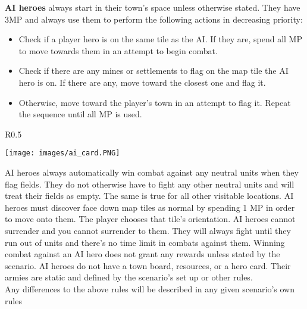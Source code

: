 \documentclass[12pt]{article}
\begin{document}
\clearpage
\textbf{AI heroes} always start in their town's space unless otherwise stated. They have 3MP and always use them to perform the following actions in decreasing priority:
\begin{itemize}
    \item Check if a player hero is on the same tile as the AI. If they are, spend all MP to move towards them in an attempt to begin combat.
    \item Check if there are any mines or settlements to flag on the map tile the AI hero is on. If there are any, move toward the closest one and flag it.
    \item Otherwise, move toward the player's town in an attempt to flag it. Repeat the sequence until all MP is used.
\end{itemize}
\begin{wrapfigure}{R}{0.5\textwidth}
    \begin{center}
    \texttt{[image: images/ai\_card.PNG]}
    \end{center}
\end{wrapfigure}
AI heroes always automatically win combat against any neutral units when they flag fields. They do not otherwise have to fight any other neutral units and will treat their fields as empty. The same is true for all other visitable locations. AI heroes must discover face down map tiles as normal by spending 1 MP in order to move onto them. The player chooses that tile’s orientation. AI heroes cannot surrender and you cannot surrender to them. They will always fight until they run out of units and there’s no time limit in combats against them. Winning combat against an AI hero does not grant any rewards unless stated by the scenario. AI heroes do not have a town board, resources, or a hero card. Their armies are static and defined by the scenario’s set up or other rules.\\[6pt]

Any differences to the above rules will be described in any given scenario’s own rules
\end{document}
